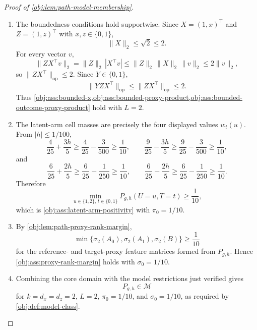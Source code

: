\begin{proof}[Proof of \cref{obj:lem:path-model-membership}]
\begin{enumerate}
\item The boundedness conditions hold supportwise.  Since \(X=(1,x)^\top\) and \(Z=(1,z)^\top\) with \(x,z\in\{0,1\}\),
\[
\|X\|_2\le\sqrt2\le2.
\]
For every vector \(v\),
\[
\|ZX^\top v\|_2
=
\|Z\|_2\,|X^\top v|
\le
\|Z\|_2\,\|X\|_2\,\|v\|_2
\le
2\|v\|_2,
\]
so \(\|ZX^\top\|_{\mathrm{op}}\le2\).  Since \(Y\in\{0,1\}\),
\[
\|YZX^\top\|_{\mathrm{op}}\le \|ZX^\top\|_{\mathrm{op}}\le2 .
\]
Thus \cref{obj:ass:bounded-x,obj:ass:bounded-proxy-product,obj:ass:bounded-outcome-proxy-product} hold with \(L=2\). %

\item The latent-arm cell masses are precisely the four displayed values \(w_t(u)\).  From \(|h|\le1/100\),
\[
\frac4{25}+\frac{3h}{5}\ge\frac4{25}-\frac3{500}\ge\frac1{10},\qquad
\frac9{25}-\frac{3h}{5}\ge\frac9{25}-\frac3{500}\ge\frac1{10},
\]
and
\[
\frac6{25}+\frac{2h}{5}\ge\frac6{25}-\frac1{250}\ge\frac1{10},\qquad
\frac6{25}-\frac{2h}{5}\ge\frac6{25}-\frac1{250}\ge\frac1{10}.
\]
Therefore
\[
\min_{u\in\{1,2\},\,t\in\{0,1\}}
P_{g,h}(U=u,T=t)
\ge
\frac1{10},
\]
which is \cref{obj:ass:latent-arm-positivity} with \(\pi_0=1/10\). %

\item By \cref{obj:lem:path-proxy-rank-margin},
\[
\min\{\sigma_2(A_0),\sigma_2(A_1),\sigma_2(B)\}\ge\frac1{10}
\]
for the reference- and target-proxy feature matrices formed from \(P_{g,h}\).  Hence \cref{obj:ass:proxy-rank-margin} holds with \(\sigma_0=1/10\). %

\item Combining the core domain with the model restrictions just verified gives
\[
P_{g,h}\in\mathcal M
\]
for \(k=d_x=d_z=2\), \(L=2\), \(\pi_0=1/10\), and \(\sigma_0=1/10\), as required by \cref{obj:def:model-class}. %
\end{enumerate}
\end{proof}
